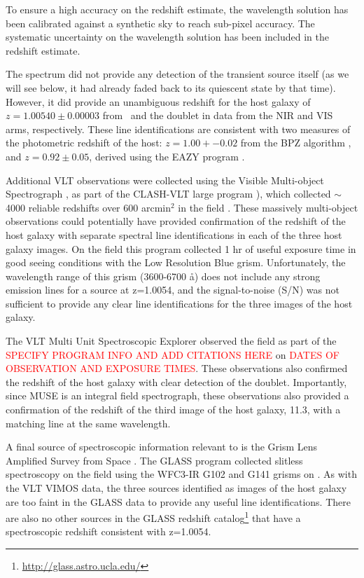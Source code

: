 To ensure a high accuracy on the redshift estimate, the wavelength solution
has been calibrated against a synthetic sky to reach sub-pixel accuracy. The
systematic uncertainty on the wavelength solution has been included in the
redshift estimate.

The spectrum did not provide any detection of the transient
source itself (as we will see below, it had already faded back to its
quiescent state by that time).  However, it did provide an unambiguous
redshift for the host galaxy of $z=1.00540\pm0.00003$ from \Ha\ and the
 doublet in data from the NIR and VIS arms,
respectively.  These line identifications are consistent with two
measures of the photometric redshift of the host: $z=1.00+-0.02$ from
the BPZ algorithm \citep{Benitez:2000}, and $z=0.92\pm0.05$, derived
using the EAZY program \citep{Brammer:2008}.

Additional VLT observations were collected using the Visible Multi-object
Spectrograph \citep[VIMOS][]{LeFevre:2003}, as part of the CLASH-VLT large
program \citep[Program 186.A-0.798; P.I.: P. Rosati;][]{Rosati:2014}),
which collected $\sim$4000 reliable redshifts over 600 arcmin$^2$ in
the  field \citep{Grillo:2015a,Balestra:2015}.  These
massively multi-object observations could potentially have provided
confirmation of the redshift of the \spock host galaxy with separate
spectral line identifications in each of the three host galaxy images.
On the  field this program collected 1 hr of useful exposure
time in good seeing conditions with the Low Resolution Blue grism.
Unfortunately, the wavelength range of this grism (3600-6700 \aa) does
not include any strong emission lines for a source at z=1.0054, and
the signal-to-noise (S/N) was not sufficient to provide any clear line
identifications for the three images of the \spock host galaxy.

The VLT Multi Unit Spectroscopic Explorer
\citep[MUSE;][]{Henault:2003,Bacon:2012} observed the  field
as part of the \textcolor{red}{SPECIFY PROGRAM INFO AND ADD CITATIONS
  HERE} on \textcolor{red}{DATES OF OBSERVATION AND EXPOSURE TIMES}.
These observations also confirmed the redshift of the host galaxy with
clear detection of the  doublet.  Importantly, since
MUSE is an integral field spectrograph, these observations also
provided a confirmation of the redshift of the third image of the host
galaxy, 11.3, with a matching  line at the same
wavelength.

A final source of spectroscopic information relevant to \spock
is the Grism Lens Amplified Survey from Space \citep[GLASS; PID:
  HST-GO-13459; PI:T. Treu][]{Schmidt:2014,Treu:2015a}. The GLASS
program collected slitless spectroscopy on the  field using
the WFC3-IR G102 and G141 grisms on \HST.  As with the VLT VIMOS data,
the three sources identified as images of the \spock host galaxy are
too faint in the GLASS data to provide any useful line
identifications.  There are also no other sources in the GLASS
redshift catalog\footnote{\url{http://glass.astro.ucla.edu/}} that
have a spectroscopic redshift consistent with z=1.0054.

